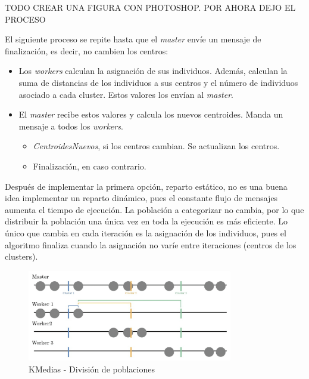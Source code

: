 		
		\color{blue} TODO CREAR UNA FIGURA CON PHOTOSHOP. POR AHORA DEJO EL PROCESO \color{black}
		
		\begin{mdframed}[roundcorner=5pt]
			El siguiente proceso se repite hasta que el \textit{master} envíe un mensaje de finalización, es decir, no cambien los centros:	
			\begin{itemize}
				\setlength\itemsep{0em} %
				\item Los \textit{workers} calculan la asignación de sus individuos. Además, calculan la suma de distancias de los individuos a sus centros y el número de individuos asociado a cada cluster. Estos valores los envían al \textit{master}.
				\item El \textit{master} recibe estos valores y calcula los nuevos centroides. Manda un mensaje a todos los \textit{workers}. 
				\begin{itemize}
					\setlength\itemsep{0em} %
					\item \textit{CentroidesNuevos}, si los centros cambian. Se actualizan los centros.
					\item Finalización, en caso contrario.
				\end{itemize}
			\end{itemize}
		\end{mdframed}
		
	
		
		Después de implementar la primera opción, reparto estático, no es una buena idea implementar un reparto dinámico, pues el constante flujo de mensajes aumenta el tiempo de ejecución. La población a categorizar no cambia, por lo que distribuir la población una única vez en toda la ejecución es más eficiente. Lo único que cambia en cada iteración es la asignación de los individuos, pues el algoritmo finaliza cuando la asignación no varíe entre iteraciones (centros de los clusters).
		
		
		\begin{figure} [!h]
			\centering
			\includegraphics[width=0.8\textwidth]{images/chapter_3/kmedias_mpi}	
			\caption{KMedias - División de poblaciones}
			\label{fig:kmediasdiv}
		\end{figure}
		
